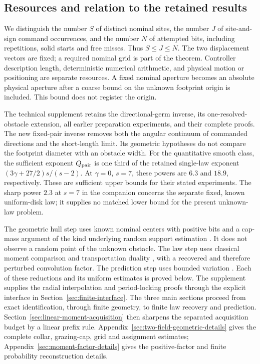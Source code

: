 \subsection{Resources and relation to the retained results}
We distinguish the number $S$ of distinct nominal sites, the number
$J$ of site-and-sign command occurrences, and the number $N$ of
attempted bits, including repetitions, solid starts and free misses.
Thus $S\le J\le N$. The two displacement vectors are fixed; a
required nominal grid is part of the theorem. Controller description
length, deterministic numerical arithmetic, and physical motion or
positioning are separate resources. A fixed nominal aperture becomes
an absolute physical aperture after a coarse bound on the unknown
footprint origin is included. This bound does not register the origin.

The technical supplement retains the directional-germ inverse, its
one-resolved-obstacle extension, all earlier preparation experiments,
and their complete proofs. The new fixed-pair inverse removes both
the angular continuum of commanded directions and the short-length
limit. Its geometric hypotheses do not compare the footprint diameter
with an obstacle width. For the quantitative smooth class, the
sufficient exponent $Q_{\rm pair}$ is one third of the retained
single-law exponent $(3\gamma+27/2)s/(s-2)$. At $\gamma=0$, $s=7$,
these powers are $6.3$ and $18.9$, respectively. These are sufficient
upper bounds for their stated experiments. The sharp power $2.3$
at $s=7$ in the companion concerns the separate fixed, known
uniform-disk law; it supplies no matched lower bound for the present
unknown-law problem.

The geometric hull step uses known nominal centers with positive
bits and a cap-mass argument of the kind underlying random support
estimation \cite{BrunelCaps}. It does not observe a random point of
the unknown obstacle. The law step uses classical moment comparison
and transportation duality \cite{RigolletWeed}, with a recovered and
therefore perturbed convolution factor. The prediction step uses
bounded variation \cite{AFP,Galerne}. Each of these reductions and
its uniform estimates is proved below. The supplement supplies the
radial interpolation and period-locking proofs through the explicit
interface in Section~\ref{sec:finite-interface}. The three main
sections proceed from exact identification, through finite geometry,
to finite law recovery and prediction. Section~\ref{sec:linear-moment-acquisition}
then sharpens the separated acquisition budget by a linear prefix rule. Appendix~\ref{sec:two-field-geometric-details}
gives the complete collar, grazing-cap, grid and assignment estimates;
Appendix~\ref{sec:moment-factor-details} gives the positive-factor
and finite probability reconstruction details.

